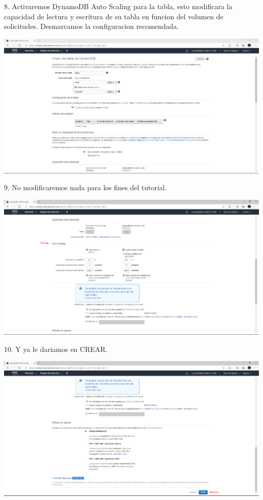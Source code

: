 \documentclass[12pt,letterpaper]{article}
\begin{document}
8.	Activaremos DynamoDB Auto Scaling para la tabla, esto modificara la capacidad de lectura y escritura de su tabla en funcion del volumen de solicitudes. Desmarcamos la configuracion recomendada.
\begin{center}
    \includegraphics[width=15cm]{img/8.png}  
\end{center}
\newpage

9.	No modificaremos nada para los fines del tutorial.
\begin{center}
    \includegraphics[width=15cm]{img/9.png}  
\end{center}


10.	Y ya le dariamos en CREAR.
\begin{center}
    \includegraphics[width=15cm]{img/10.png}  
\end{center}
\newpage
\end{document}
